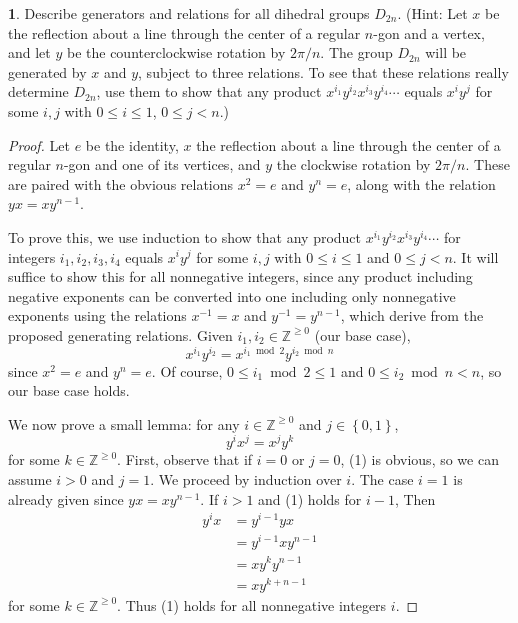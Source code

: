 \documentclass{article}
\theoremstyle{definition}
\newtheorem{ex}{}[section]
\begin{document}
\begin{ex}
	Describe generators and relations for all dihedral groups $D_{2n}$.
	(Hint: Let $x$ be the reflection about a line through the center of a regular $n$-gon and a vertex, and let $y$ be the counterclockwise rotation by $2\pi / n$. The group $D_{2n}$ will be generated by $x$ and $y$, subject to three relations. To see that these relations really determine $D_{2n}$, use them to show that any product $x^{i_1}y^{i_2}x^{i_3}y^{i_4} \cdots$ equals $x^iy^j$ for some $i, j$ with $0 \leq i \leq 1$, $0 \leq j < n$.)
\end{ex}
\begin{proof}
	Let $e$ be the identity, $x$ the reflection about a line through the center of a regular $n$-gon and one of its vertices, and $y$ the clockwise rotation by $2\pi/n$.
	These are paired with the obvious relations $x^2 = e$ and $y^n = e$, along with the relation $yx = xy^{n - 1}$.

	To prove this, we use induction to show that any product $x^{i_1}y^{i_2}x^{i_3}y^{i_4}\cdots$ for integers $i_1, i_2, i_3, i_4$ equals $x^iy^j$ for some $i, j$ with $0 \leq i \leq 1$ and $0 \leq j < n$.
	It will suffice to show this for all nonnegative integers, since any product including negative exponents can be converted into one including only nonnegative exponents using the relations $x^{-1} = x$ and $y^{-1} = y^{n - 1}$, which derive from the proposed generating relations.
	Given $i_1, i_2 \in \mathbb{Z}^{\geq 0}$ (our base case), \begin{equation*}
		x^{i_1}y^{i_2} = x^{i_1 \bmod 2}y^{i_2 \bmod n}
	\end{equation*}
	since $x^2 = e$ and $y^n = e$.
	Of course, $0 \leq i_1 \bmod 2 \leq 1$  and $0 \leq i_2 \bmod n < n$, so our base case holds.

	We now prove a small lemma: for any $i \in \mathbb{Z}^{\geq 0}$ and $j \in \left\lbrace 0, 1 \right\rbrace$, \begin{equation*}
		y^ix^j = x^jy^k \tag{1}
	\end{equation*}
	for some $k \in \mathbb{Z}^{\geq 0}$.
	First, observe that if $i = 0$ or $j = 0$, (1) is obvious, so we can assume $i > 0$ and $j = 1$.
	We proceed by induction over $i$.
	The case $i = 1$ is already given since $yx = xy^{n - 1}$.
	If $i > 1$ and (1) holds for $i - 1$,
	Then \begin{align*}
		y^ix & = y^{i - 1}yx         \\
		     & = y^{i - 1}xy^{n - 1} \\
		     & = xy^ky^{n - 1}       \\
		     & = xy^{k + n - 1}
	\end{align*}
	for some $k \in \mathbb{Z}^{\geq 0}$.
	Thus (1) holds for all nonnegative integers $i$.


\end{proof}
\end{document}
